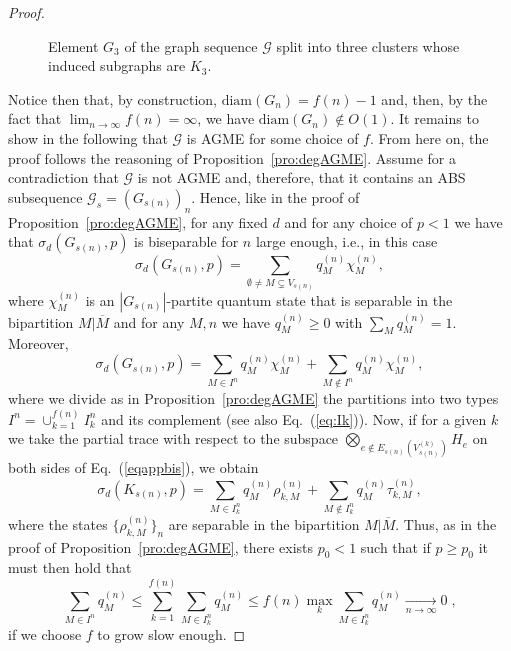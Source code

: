 \documentclass[a4paper,onecolumn,accepted=2024-12-14]{quantumarticle}
\theoremstyle{plain}
\newcommand{\cG}{{\mathcal G}}         %
\begin{document}
\begin{proof}
\begin{figure}[h]
 \caption{Element $G_3$ of the graph sequence $\cG$ split into three clusters whose induced subgraphs are $K_3$.}
\label{fig:k3}
\end{figure}



Notice then that, by construction, $\mathrm{diam}(G_n)=f(n)-1$ and, then, by the fact that \linebreak $\lim_{n\to\infty}f(n)=\infty$, we have $\textrm{diam}(G_n)\notin O(1)$.
It remains to show in the following that $\cG$ is AGME for some choice of $f$.
From here on, the proof follows the reasoning of
Proposition~\ref{pro:degAGME}. Assume for a contradiction that $\cG$ is not AGME and, therefore, that it contains an ABS subsequence $\cG_s=(G_{s(n)})_n$. Hence, like in the proof of Proposition~\ref{pro:degAGME}, for any fixed $d$ and for any choice of $p<1$ we have that $\sigma_d(G_{s(n)},p)$ is biseparable for $n$ large enough, i.e., in this case
\begin{equation}\label{eqapp}
\sigma_d(G_{s(n)},p)=\sum_{\emptyset\neq M\subsetneq V_{s(n)}}q_M^{(n)}\chi_M^{(n)},
\end{equation}
where $\chi_M^{(n)}$ is an $|G_{s(n)}|$-partite quantum state that is separable in the bipartition $M|\overline{M}$ and for any $M,n$ we have $q_M^{(n)}\geq 0$ with
$\sum_M q_M^{(n)}=1$. Moreover,
\begin{equation}\label{eqappbis}
\sigma_d(G_{s(n)},p)=\sum_{M\in I^n}q_M^{(n)}\chi_M^{(n)}+\sum_{M\notin I^n}q_M^{(n)}\chi_M^{(n)},
\end{equation}
where we divide as in Proposition~\ref{pro:degAGME} the partitions into two types
$I^n= \cup_{k=1}^{f(n)}I^n_k$ and its complement (see also Eq.~(\ref{eq:Ik})).
Now, if for a given $k$ we take the partial trace with respect to the subspace
$\bigotimes_{e\notin E_{s(n)}\left(V_{s(n)}^{(k)}\right)}H_e$ on both sides of Eq.~(\ref{eqappbis}), we obtain
\begin{equation}
\sigma_d(K_{s(n)},p)=\sum_{M\in I_k^n}q_M^{(n)}\rho_{k,M}^{(n)}+\sum_{M\notin I_k^n}q_M^{(n)}\tau_{k,M}^{(n)},
\end{equation}
where the states $\{\rho_{k,M}^{(n)}\}_n$ are separable in the bipartition
$M|\overline{M}$. Thus, as in the proof of Proposition~\ref{pro:degAGME}, there exists $p_0<1$ such that if $p\geq p_0$ it must then hold that
\begin{equation}\label{argu1app}
\sum_{M\in I^n}q_M^{(n)}\leq\sum_{k=1}^{f(n)}\sum_{M\in I_k^n}q_M^{(n)}\leq f(n)\max_k\sum_{M\in I_k^n}q_M^{(n)}\xrightarrow[n\to\infty]{} 0\;,
\end{equation}
if we choose $f$ to grow slow enough.


\end{proof}
\end{document}
